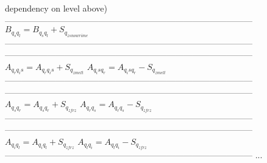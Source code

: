 \documentclass[
a4paper,     %
12pt,        %
article,
onecolumn,   %
openany,     %
]{memoir}
\begin{document}
\begin{algorithm}[H]
\begin{algorithmic}
\State dependency on level above)
\Indent
\vspace{-.2cm}
\State ---------------------------------------------------------------------------------------
\vspace{-.2cm}
\State $B_{q_s q_l} = B_{q_s q_l} + S_{q_{zsnowrime}}$
\vspace{-.2cm}
\State ---------------------------------------------------------------------------------------
\vspace{.4cm}
\EndIndent
{}
\Indent
\vspace{-.2cm}
\State ---------------------------------------------------------------------------------------
\vspace{-.2cm}
\State $A_{q_r q_is} = A_{q_r q_is} + S_{q_{zmelt}}$
\State $A_{q_is q_r} = A_{q_is q_r} - S_{q_{zmelt}}$
\vspace{-.2cm}
\State ---------------------------------------------------------------------------------------
\vspace{.4cm}
\EndIndent
{}
\Indent
\vspace{-.2cm}
\State ---------------------------------------------------------------------------------------
\vspace{-.2cm}
\State $A_{q_s q_r} = A_{q_s q_r} + S_{q_{zfrz}}$
\State $A_{q_r q_s} = A_{q_r q_s} - S_{q_{zfrz}}$
\vspace{-.2cm}
\State ---------------------------------------------------------------------------------------
\vspace{.4cm}
\EndIndent
{}
\Indent
\vspace{-.2cm}
\State ---------------------------------------------------------------------------------------
\vspace{-.2cm}
\State $A_{q_i q_l} = A_{q_i q_l} + S_{q_{zfrz}}$
\State $A_{q_l q_i} = A_{q_l q_i} - S_{q_{zfrz}}$
\vspace{-.2cm}
\State ---------------------------------------------------------------------------------------
\vspace{.4cm}
\EndIndent
\State ...
\end{algorithmic}
\end{algorithm}
%
\end{document}

